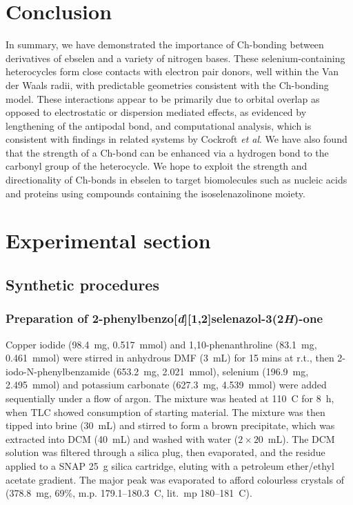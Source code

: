 \begin{refsection}
    \section{Conclusion}
    In summary, we have demonstrated the importance of Ch-bonding between derivatives of ebselen  and a variety of nitrogen bases.
    These selenium-containing heterocycles form close contacts with electron pair donors, well within the Van der Waals radii, with predictable geometries consistent with the Ch-bonding model.
    These interactions appear to be primarily due to orbital overlap as opposed to electrostatic or dispersion mediated effects, as evidenced by lengthening of the antipodal  bond, and computational analysis, which is consistent with findings in related systems by Cockroft \textit{et al}.\autocite{Pascoe2017}
    We have also found that the strength of a Ch-bond can be enhanced via a hydrogen bond to the carbonyl group of the heterocycle.
    We hope to exploit the strength and directionality of Ch-bonds in ebselen to target biomolecules such as nucleic acids and proteins using compounds containing the isoselenazolinone moiety.
    
    \section{Experimental section}
    
    \subsection{Synthetic procedures}
    
    \subsubsection[Preparation of \refcmpd{ebs}]{Preparation of 2-phenylbenzo[\textit{d}][1,2]selenazol-3(2\textit{H})-one }
    
    Copper iodide (98.4~mg, 0.517~mmol) and 1,10-phenanthroline (83.1~mg, 0.461~mmol) were stirred in anhydrous DMF (3~mL) for 15 mins at r.t., then 2-iodo-N-phenylbenz\-amide (653.2~mg, 2.021~mmol), selenium (196.9~mg, 2.495~mmol) and potassium carbonate (627.3~mg, 4.539~mmol) were added sequentially under a flow of argon.
    The mixture was heated at 110~\degree{}C for 8~h, when TLC showed consumption of starting material.
    The mixture was then tipped into brine (30~mL) and stirred to form a brown precipitate, which was extracted into DCM (40~mL) and washed with water ($ 2 \times 20 $~mL).
    The DCM solution was filtered through a silica plug, then evaporated, and the residue applied to a SNAP 25~g silica cartridge, eluting with a petroleum ether/ethyl acetate gradient.
    The major peak was evaporated to afford colourless crystals of  (378.8~mg, 69\%, m.p. 179.1--180.3~\degree{}C, lit.\ mp 180--181~\degree{}C).\autocite{Bhabak2010} 
    

\end{refsection}
